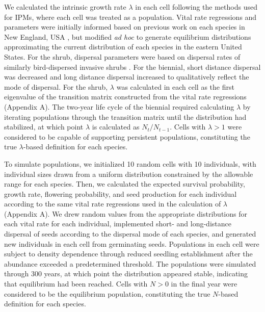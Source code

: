 \documentclass[preprint,review,times,12pt]{elsarticle}
\begin{document}
We calculated the intrinsic growth rate $\lambda$ in each cell following the methods used for IPMs, where each cell was treated as a population. Vital rate regressions and parameters were initially informed based on previous work on each species in New England, USA \citep{Merow2017}, but modified \emph{ad hoc} to generate equilibrium distributions approximating the current distribution of each species in the eastern United States. For the shrub, dispersal parameters were based on dispersal rates of similarly bird-dispersed invasive shrubs \citep{Merow2011a,Szewczyk2019}. For the biennial, short distance dispersal was decreased and long distance dispersal increased to qualitatively reflect the mode of dispersal. For the shrub, $\lambda$ was calculated in each cell as the first eigenvalue of the transition matrix constructed from the vital rate regressions (Appendix A). The two-year life cycle of the biennial required calculating $\lambda$ by iterating populations through the transition matrix until the distribution had stabilized, at which point $\lambda$ is calculated as $N_t/N_{t-1}$. Cells with $\lambda > 1$ were considered to be capable of supporting persistent populations, constituting the true $\lambda$-based definition for each species. 

To simulate populations, we initialized 10 random cells with 10 individuals, with individual sizes drawn from a uniform distribution constrained by the allowable range for each species. Then, we calculated the expected survival probability, growth rate, flowering probability, and seed production for each individual according to the same vital rate regressions used in the calculation of $\lambda$ (Appendix A). We drew random values from the appropriate distributions for each vital rate for each individual, implemented short- and long-distance dispersal of seeds according to the dispersal mode of each species, and generated new individuals in each cell from germinating seeds. Populations in each cell were subject to density dependence through reduced seedling establishment \citep{Ellner2006,Rebarber2012,Merow2014a} after the abundance exceeded a predetermined threshold. The populations were simulated through 300 years, at which point the distribution appeared stable, indicating that equilibrium had been reached. Cells with $N > 0$ in the final year were considered to be the equilibrium population, constituting the true $N$-based definition for each species. 
\end{document}
